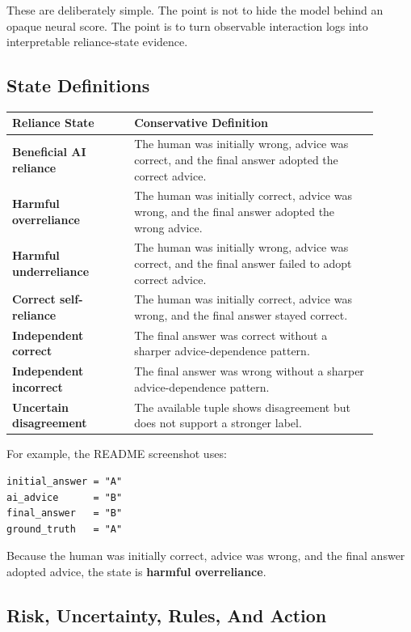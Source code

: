 \documentclass[11pt]{article}
\newcommand{\state}[1]{\textbf{#1}}
\begin{document}
These are deliberately simple. The point is not to hide the model behind an opaque neural score. The point is to turn observable interaction logs into interpretable reliance-state evidence.

\subsection{State Definitions}

\begin{longtable}{p{0.30\linewidth} p{0.60\linewidth}}
\toprule
\textbf{Reliance State} & \textbf{Conservative Definition} \\
\midrule
\state{Beneficial AI reliance} & The human was initially wrong, advice was correct, and the final answer adopted the correct advice. \\
\state{Harmful overreliance} & The human was initially correct, advice was wrong, and the final answer adopted the wrong advice. \\
\state{Harmful underreliance} & The human was initially wrong, advice was correct, and the final answer failed to adopt correct advice. \\
\state{Correct self-reliance} & The human was initially correct, advice was wrong, and the final answer stayed correct. \\
\state{Independent correct} & The final answer was correct without a sharper advice-dependence pattern. \\
\state{Independent incorrect} & The final answer was wrong without a sharper advice-dependence pattern. \\
\state{Uncertain disagreement} & The available tuple shows disagreement but does not support a stronger label. \\
\bottomrule
\end{longtable}

For example, the README screenshot uses:

\begin{lstlisting}
initial_answer = "A"
ai_advice      = "B"
final_answer   = "B"
ground_truth   = "A"
\end{lstlisting}

Because the human was initially correct, advice was wrong, and the final answer adopted advice, the state is \state{harmful overreliance}.

\subsection{Risk, Uncertainty, Rules, And Action}
\end{document}
